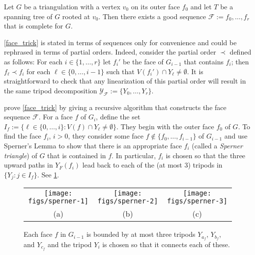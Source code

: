 \documentclass{patmorin}
\begin{document}

\begin{lem}\label{face_trick}
  Let $G$ be a triangulation with a vertex $v_0$ on its outer face $f_0$ and let $T$ be a spanning tree of $G$ rooted at $v_0$.  Then there exists a good sequence $\mathcal{F}:=f_0,\ldots,f_{r}$ that is complete for $G$.
\end{lem}

\begin{rem}
  \cref{face_trick} is stated in terms of sequences only for convenience and could be rephrased in terms of partial orders. Indeed, consider the partial order $\prec$ defined as follows:  For each $i\in\{1,\ldots,r\}$ let $f_i'$ be the face of $G_{i-1}$ that contains $f_i$; then $f_\ell\prec f_i$ for each $\ell\in\{0,\ldots,i-1\}$ such that $V(f_i')\cap Y_\ell\neq\emptyset$.  It is straightforward to check that any linearization of this partial order will result in the same tripod decomposition $\mathcal{Y_F}:=\{Y_0,\ldots,Y_{r}\}$.
\end{rem}

\citet{dujmovic.joret.ea:planar} prove \cref{face_trick} by giving a recursive algorithm that constructs the face sequence $\mathcal{F}$.  For a face $f$ of $G_i$, define the set $I_f:=\{\ell\in\{0,\ldots,i\}:V(f)\cap Y_\ell\neq\emptyset\}$.  They begin with the outer face $f_0$ of $G$.  To find the face $f_i$, $i>0$, they consider some face $f\not\in\{f_0,\ldots,f_{i-1}\}$ of $G_{i-1}$ and use Sperner's Lemma to show that there is an appropriate face $f_i$ (called a \emph{Sperner triangle}) of $G$ that is contained in $f$. In particular, $f_i$ is chosen so that the three upward paths in $Y_F(f_i)$ lead back to each of the (at most 3) tripods in $\{Y_j:j\in I_f\}$. See \cref{sperner}.

\begin{figure}
  \begin{center}
    \begin{tabular}{ccc}
      \texttt{[image: figs/sperner-1]} &
      \texttt{[image: figs/sperner-2]} &
      \texttt{[image: figs/sperner-3]} \\
      (a) & (b) & (c)
    \end{tabular}
  \end{center}
  \caption{Each face $f$ in $G_{i-1}$ is bounded by at most three tripods $Y_{a_f}$, $Y_{b_f}$, and $Y_{c_f}$ and the tripod $Y_i$ is chosen so that it connects each of these.}
  \label{sperner}
\end{figure}
\end{document}
